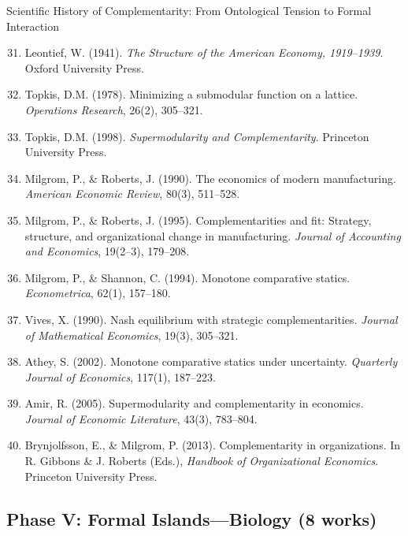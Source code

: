 \begin{chapter}{Scientific History of Complementarity: From Ontological Tension to Formal Interaction}
\begin{enumerate}
    \setcounter{enumi}{30}
    \item Leontief, W. (1941). \textit{The Structure of the American Economy, 1919--1939}. Oxford University Press.

    \item Topkis, D.M. (1978). Minimizing a submodular function on a lattice. \textit{Operations Research}, 26(2), 305--321.

    \item Topkis, D.M. (1998). \textit{Supermodularity and Complementarity}. Princeton University Press.

    \item Milgrom, P., \& Roberts, J. (1990). The economics of modern manufacturing. \textit{American Economic Review}, 80(3), 511--528.

    \item Milgrom, P., \& Roberts, J. (1995). Complementarities and fit: Strategy, structure, and organizational change in manufacturing. \textit{Journal of Accounting and Economics}, 19(2--3), 179--208.

    \item Milgrom, P., \& Shannon, C. (1994). Monotone comparative statics. \textit{Econometrica}, 62(1), 157--180.

    \item Vives, X. (1990). Nash equilibrium with strategic complementarities. \textit{Journal of Mathematical Economics}, 19(3), 305--321.

    \item Athey, S. (2002). Monotone comparative statics under uncertainty. \textit{Quarterly Journal of Economics}, 117(1), 187--223.

    \item Amir, R. (2005). Supermodularity and complementarity in economics. \textit{Journal of Economic Literature}, 43(3), 783--804.

    \item Brynjolfsson, E., \& Milgrom, P. (2013). Complementarity in organizations. In R. Gibbons \& J. Roberts (Eds.), \textit{Handbook of Organizational Economics}. Princeton University Press.
\end{enumerate}

\subsection{Phase V: Formal Islands---Biology (8 works)}


\end{chapter}
